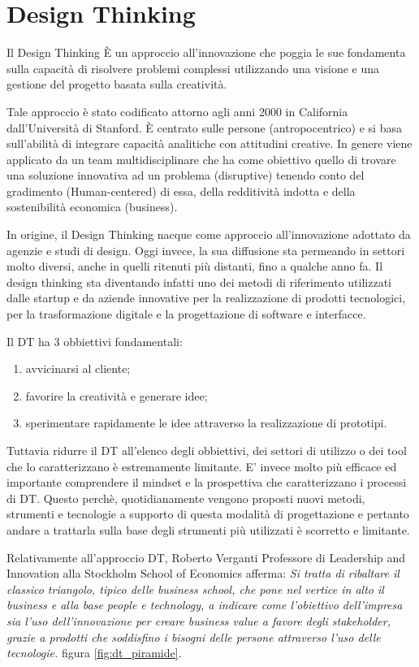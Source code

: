 \section{Design Thinking}
Il Design Thinking È un approccio all’innovazione che poggia le sue fondamenta sulla capacità di risolvere problemi complessi utilizzando una visione e una gestione del progetto basata sulla creatività. 

Tale approccio è stato codificato attorno agli anni 2000 in California dall’Università di Stanford. È centrato sulle persone (antropocentrico) e si basa sull’abilità di integrare capacità analitiche con attitudini creative. In genere viene applicato da un team multidisciplinare che ha come obiettivo quello di trovare una soluzione innovativa ad un problema (disruptive) tenendo conto del gradimento (Human-centered) di essa, della redditività indotta e della sostenibilità economica (business).

In origine, il Design Thinking nacque come approccio all’innovazione adottato da agenzie e studi di design. Oggi invece, la sua diffusione sta permeando in settori molto diversi, anche in quelli ritenuti più distanti, fino a qualche anno fa. Il design thinking sta diventando infatti uno dei metodi di riferimento utilizzati dalle startup e da aziende innovative per la realizzazione di prodotti tecnologici, per la trasformazione digitale e la progettazione di software e interfacce.

Il DT ha 3 obbiettivi fondamentali:

\begin{enumerate}
    \item avvicinarsi al cliente;
    \item favorire la creatività e generare idee;
    \item sperimentare rapidamente le idee attraverso la realizzazione di prototipi.
\end{enumerate}

Tuttavia ridurre il DT all’elenco degli obbiettivi, dei settori di utilizzo o dei tool che lo caratterizzano è estremamente limitante. E' invece molto più efficace ed importante comprendere il mindset e la prospettiva che caratterizzano i processi di DT. Questo perchè, quotidianamente vengono proposti nuovi metodi, strumenti e tecnologie a supporto di questa modalità di progettazione e pertanto andare a trattarla sulla base degli strumenti più utilizzati è scorretto e limitante.

Relativamente all'approccio DT, Roberto Verganti Professore di Leadership and Innovation alla Stockholm School of Economics afferma: \textit{Si tratta di ribaltare il classico triangolo, tipico delle business school, che pone nel vertice in alto il business e alla base people e technology, a indicare come l’obiettivo dell’impresa sia l’uso dell’innovazione per creare business value a favore degli stakeholder, grazie a prodotti che soddisfino i bisogni delle persone attraverso l’uso delle tecnologie.} figura \ref{fig:dt_piramide}.

